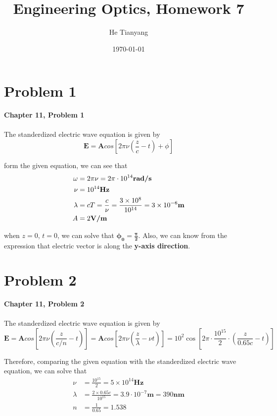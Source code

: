 \documentclass{article}
\title{Engineering Optics, Homework 7}
\author{He Tianyang}
\date{\today}
\begin{document}
\maketitle

\section{Problem 1}
\textbf{Chapter 11, Problem 1}\\\\
The standerdized electric wave equation is given by
\begin{equation}
    \mathbf{E} = \mathbf{A}cos\left[2\pi\nu(\frac{z}{c}-t)+\phi\right]
\end{equation}

form the given equation, we can see that
\begin{align*}
    \omega  & = 2\pi\nu = 2\pi\cdot 10^{14} \textbf{rad\slash s}                               \\
    \nu     & = 10^{14} \textbf{Hz}                                                            \\
    \lambda & = cT = \frac{c}{\nu} = \frac{3\times 10^8}{10^{14}} = 3\times 10^{-6} \textbf{m} \\
    A       & =2\textbf{V\slash m}
\end{align*}

when $z=0$, $t=0$, we can solve that $\mathbf{\phi_0 = \frac{\pi}{2}}$. Also, we can know from the expression that electric vector is along the \textbf{y-axis direction}.

\section{Problem 2}
\textbf{Chapter 11, Problem 2}\\\\

The standerdized electric wave equation is given by
\begin{equation}
    \mathbf{E} = \mathbf{A}cos\left[2\pi\nu(\frac{z}{c/n}-t)\right] = \mathbf{A}cos\left[2\pi\nu(\frac{z}{\lambda}-\nu t)\right] = 10^2\cos\left[2\pi\cdot\frac{10^15}{2}\cdot\left(\frac{z}{0.65c}-t\right)\right]
\end{equation}

Therefore, comparing the given equation with the standerdized electric wave equation, we can solve that
\begin{align*}
    \nu     & = \frac{10^15}{2} = 5\times 10^{14} \textbf{Hz}                               \\
    \lambda & = \frac{2\times 0.65c}{10^15} = 3.9\cdot 10^{-7} \textbf{m} = 390 \textbf{nm} \\
    n       & = \frac{1}{0.65} = 1.538
\end{align*}
\end{document}
